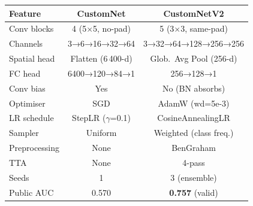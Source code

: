\documentclass[a4paper, 10pt, twocolumn]{article}
\begin{document}
\begin{minipage}[t]{0.47\textwidth}

\label{tab:arch}
\vspace{3pt}
\footnotesize
\setlength{\tabcolsep}{4pt}
\renewcommand{\arraystretch}{1.10}
\begin{tabular}{@{}lcc@{}}
\toprule
\textbf{Feature} & \textbf{CustomNet} & \textbf{CustomNetV2} \\
\midrule
Conv blocks  & 4 (5$\times$5, no-pad)    & 5 (3$\times$3, same-pad) \\
Channels     & 3→6→16→32→64              & 3→32→64→128→256→256 \\
Spatial head & Flatten (6\,400-d)        & Glob.\ Avg Pool (256-d) \\
FC head      & 6400→120→84→1            & 256→128→1 \\
Conv bias    & Yes                       & No (BN absorbs) \\
Optimiser    & SGD                       & AdamW (wd=5e-3) \\
LR schedule  & StepLR ($\gamma$=0.1)    & CosineAnnealingLR \\
Sampler      & Uniform                   & Weighted (class freq.) \\
Preprocessing& None                      & BenGraham \\
TTA          & None                      & 4-pass \\
\midrule
Seeds        & 1                         & 3 (ensemble) \\
Public AUC   & 0.570                     & \textbf{0.757} (valid) \\
\bottomrule
\end{tabular}

\end{minipage}%
\hfill
\end{document}
